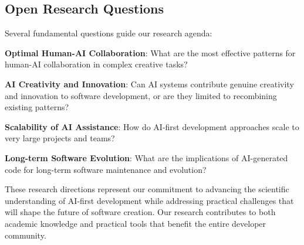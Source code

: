 \subsection*{Open Research Questions}

Several fundamental questions guide our research agenda:

\begin{expandedlist}
    \item \textbf{Optimal Human-AI Collaboration}: What are the most effective patterns for human-AI collaboration in complex creative tasks?
    \item \textbf{AI Creativity and Innovation}: Can AI systems contribute genuine creativity and innovation to software development, or are they limited to recombining existing patterns?
    \item \textbf{Scalability of AI Assistance}: How do AI-first development approaches scale to very large projects and teams?
    \item \textbf{Long-term Software Evolution}: What are the implications of AI-generated code for long-term software maintenance and evolution?
\end{expandedlist}

These research directions represent our commitment to advancing the scientific understanding of AI-first development while addressing practical challenges that will shape the future of software creation. Our research contributes to both academic knowledge and practical tools that benefit the entire developer community.